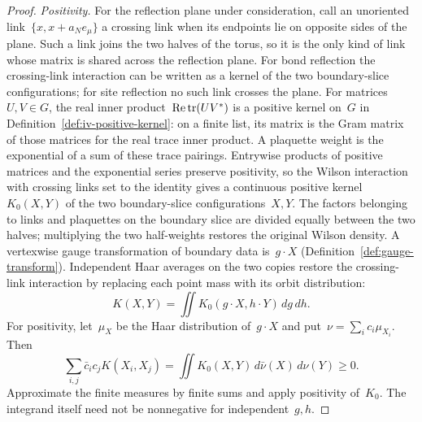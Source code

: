 \begin{proof}
\emph{Positivity.}
For the reflection plane under consideration, call an unoriented link~$\{x,x+a_Ne_\mu\}$ a crossing link when its endpoints lie on opposite sides of the plane.
Such a link joins the two halves of the torus, so it is the only kind of link whose matrix is shared across the reflection plane. For bond reflection the crossing-link interaction can be written as a kernel of the two boundary-slice configurations; for site reflection no such link crosses the plane.
For matrices~$U,V\in G$, the real inner product~$\operatorname{Re}\operatorname{tr}(UV^*)$ is a positive kernel on~$G$ in Definition~\ref{def:iv-positive-kernel}: on a finite list, its matrix is the Gram matrix of those matrices for the real trace inner product.
A plaquette weight is the exponential of a sum of these trace pairings. Entrywise products of positive matrices and the exponential series preserve positivity, so the Wilson interaction with crossing links set to the identity gives a continuous positive kernel~$K_0(X,Y)$ of the two boundary-slice configurations~$X,Y$. The factors belonging to links and plaquettes on the boundary slice are divided equally between the two halves; multiplying the two half-weights restores the original Wilson density.
A vertexwise gauge transformation of boundary data is~$g\cdot X$ (Definition~\ref{def:gauge-transform}). Independent Haar averages on the two copies restore the crossing-link interaction by replacing each point mass with its orbit distribution:
\begin{equation*}
 K(X,Y)=\iint K_0(g\cdot X,h\cdot Y)\,dg\,dh.
\end{equation*}
For positivity, let~$\mu_X$ be the Haar distribution of~$g\cdot X$ and put~$\nu=\sum_i c_i\mu_{X_i}$.
Then
\begin{equation}\label{eq:iv-averaged-positive}
 \sum_{i,j}\bar c_i c_jK(X_i,X_j)
 =\iint K_0(X,Y)\,d\bar\nu(X)\,d\nu(Y)\ge0.
\end{equation}
Approximate the finite measures by finite sums and apply positivity of~$K_0$. The integrand itself need not be nonnegative for independent~$g,h$.


\end{proof}
